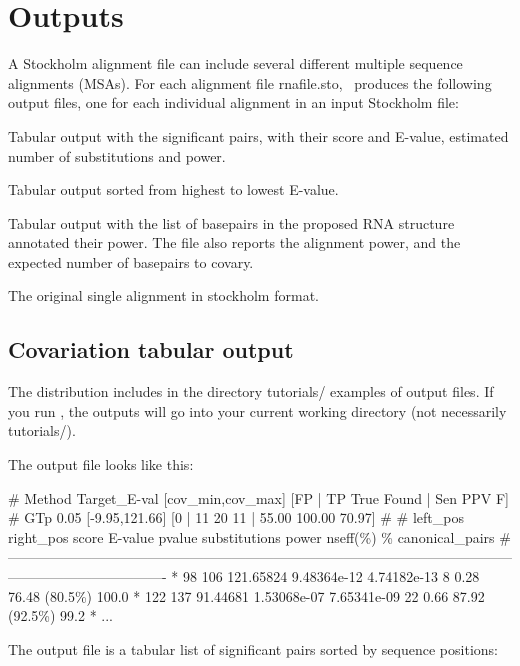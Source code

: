 \label{section:outputs}
\setcounter{footnote}{0}
\section{Outputs}

A Stockholm alignment file can include several different multiple
sequence alignments (MSAs).  For each alignment file
rnafile.sto, \rscape\ produces the following output files, one for
each individual alignment in an input Stockholm file:

\begin{sreitems}{}
%
\item[\emprog{rnafile\_msaname.cov}] Tabular output with the significant pairs,
  with their score and E-value, estimated number of substitutions and power.
%
\item[\emprog{rnafile\_msaname.sorted.cov}] Tabular output sorted from highest to
  lowest E-value.
%
\item[\emprog{rnafile\_msaname.power}]
Tabular output with the list of basepairs in the proposed RNA structure annotated their power. The file also reports 
the alignment power, and the expected number of basepairs to covary.
%
%
\item[\emprog{rnafile\_msaname.original.sto}]
The original single alignment in stockholm format. 
\end{sreitems}

\subsection{Covariation tabular output}

The distribution includes in the directory tutorials/ examples of
output files. If you run \rscape, the outputs will go into your
current working directory (not necessarily tutorials/).


The output file  looks like this:\\

\begin{sreoutput}
# Method Target_E-val [cov_min,cov_max] [FP | TP True Found | Sen PPV F] 
# GTp    0.05         [-9.95,121.66]     [0 | 11 20 11 | 55.00 100.00 70.97] 
#
#       left_pos   right_pos    score          E-value           pvalue       substitutions     power   nseff(\%)       \% canonical_pairs
#----------------------------------------------------------------------------------------------------------------------------------------------
*             98         106    121.65824       9.48364e-12     4.74182e-13     8               0.28    76.48 (80.5\%)   100.0
*            122         137    91.44681        1.53068e-07     7.65341e-09     22              0.66    87.92 (92.5\%)   99.2
*
...
\end{sreoutput}
The output file is a tabular list of significant pairs sorted by sequence positions:

